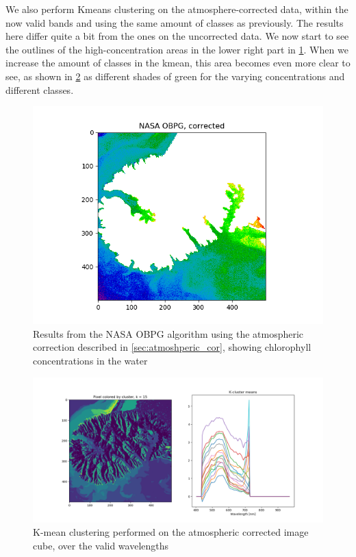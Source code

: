 We also perform Kmeans clustering on the atmosphere-corrected data, within the now 
valid bands and using the same amount of classes as previously. 
The results here differ quite a bit from the ones on the uncorrected data. We now 
start to see the outlines of the high-concentration areas in the lower right part 
in \cref{fig:obpg_corrected}. When we increase the amount of classes in the kmean, 
this area becomes even more clear to see, as shown in \cref{fig:kmean_corrected} 
as different shades of green for the varying concentrations and different classes.


\begin{figure}
    \centering
    \includegraphics[width=\textwidth]{../fig/NASA OBPG, corrected.png}
    \caption{Results from the NASA OBPG algorithm using the atmospheric correction described 
    in \cref{sec:atmoshperic_cor}, showing chlorophyll concentrations in the water}
    \label{fig:obpg_corrected}
\end{figure}


\begin{figure}
    \centering
    \includegraphics[width=\textwidth]{../fig/kmean/kmean_corrected15.png}
    \caption{K-mean clustering performed on the atmospheric corrected image cube, over 
	the valid wavelengths}
    \label{fig:kmean_corrected}
\end{figure}



